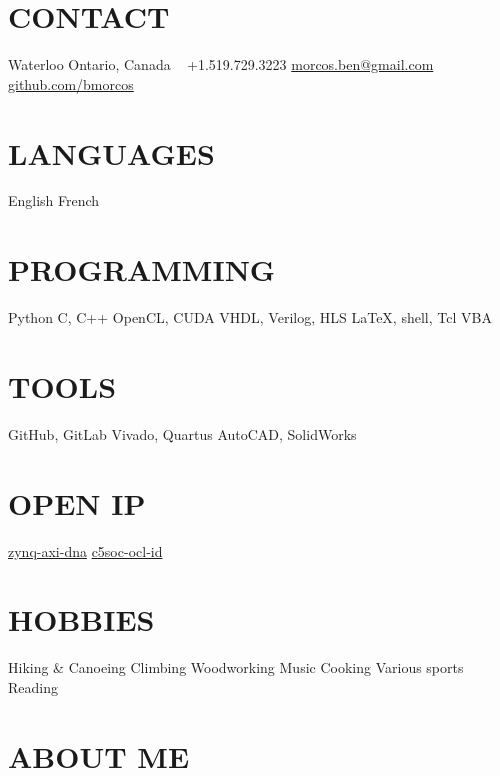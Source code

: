 \documentclass[a4paper,nocolors]{cv-friggeri-ben}
\begin{document}


\begin{aside} %
    \section{CONTACT}
    \hfill Waterloo
    \hfill Ontario, Canada
    ~
    \hfill +1.519.729.3223
    \hfill \href{mailto:morcos.ben@gmail.com}{morcos.ben@gmail.com}
    ~
    \hfill \href{https://github.com/bmorcos}{github.com/bmorcos}
    \section{LANGUAGES}
    English
    French
    \section{PROGRAMMING}
    Python
    C, C++
    OpenCL, CUDA
    VHDL, Verilog, HLS
    \LaTeX, shell, Tcl
    VBA
    \section{TOOLS}
    GitHub, GitLab
    Vivado, Quartus
    AutoCAD, SolidWorks
    \section{OPEN IP}
    \href{https://github.com/abr/zynq-axi-dna}{zynq-axi-dna}
    \href{https://github.com/abr/c5soc-ocl-id}{c5soc-ocl-id}
    \section{HOBBIES}
    Hiking \& Canoeing
    Climbing
    Woodworking
    Music
    Cooking
    Various sports
    Reading
\end{aside}



\section{ABOUT ME}
\vspace{-2pt}
\end{document}
